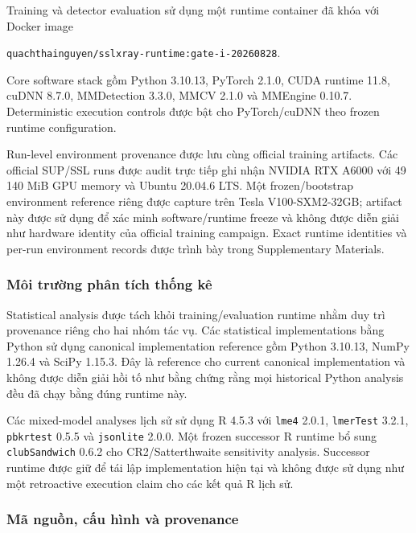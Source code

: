 \documentclass[pdflatex,sn-mathphys-num]{sn-jnl}%
\theoremstyle{thmstyleone}%
\theoremstyle{thmstyletwo}%
\theoremstyle{thmstylethree}%
\begin{document}
Training và detector evaluation sử dụng một runtime container đã khóa với
Docker image

\begin{center}
\texttt{quachthainguyen/sslxray-runtime:gate-i-20260828}.
\end{center}

Core software stack gồm Python 3.10.13, PyTorch 2.1.0, CUDA runtime 11.8,
cuDNN 8.7.0, MMDetection 3.3.0, MMCV 2.1.0 và MMEngine 0.10.7.
Deterministic execution controls được bật cho PyTorch/cuDNN theo frozen
runtime configuration.

Run-level environment provenance được lưu cùng official training artifacts.
Các official SUP/SSL runs được audit trực tiếp ghi nhận NVIDIA RTX A6000
với 49\,140 MiB GPU memory và Ubuntu 20.04.6 LTS. Một frozen/bootstrap
environment reference riêng được capture trên Tesla V100-SXM2-32GB; artifact
này được sử dụng để xác minh software/runtime freeze và không được diễn
giải như hardware identity của official training campaign. Exact runtime
identities và per-run environment records được trình bày trong Supplementary
Materials.

\subsubsection{Môi trường phân tích thống kê}
\label{subsubsec:statistical_runtime}

Statistical analysis được tách khỏi training/evaluation runtime nhằm duy
trì provenance riêng cho hai nhóm tác vụ. Các statistical implementations
bằng Python sử dụng canonical implementation reference gồm Python 3.10.13,
NumPy 1.26.4 và SciPy 1.15.3. Đây là reference cho current canonical
implementation và không được diễn giải hồi tố như bằng chứng rằng mọi
historical Python analysis đều đã chạy bằng đúng runtime này.

Các mixed-model analyses lịch sử sử dụng R 4.5.3 với
\texttt{lme4} 2.0.1, \texttt{lmerTest} 3.2.1,
\texttt{pbkrtest} 0.5.5 và \texttt{jsonlite} 2.0.0. Một frozen successor
R runtime bổ sung \texttt{clubSandwich} 0.6.2 cho CR2/Satterthwaite
sensitivity analysis. Successor runtime được giữ để tái lập implementation
hiện tại và không được sử dụng như một retroactive execution claim cho các
kết quả R lịch sử.

\subsubsection{Mã nguồn, cấu hình và provenance}
\label{subsubsec:reproducibility_materials}
\end{document}
